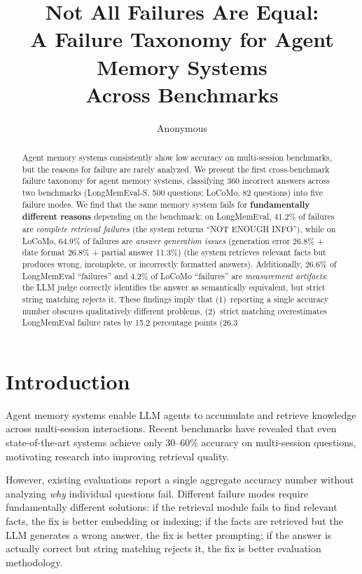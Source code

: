 ﻿\documentclass{article}
\title{Not All Failures Are Equal:\\ A Failure Taxonomy for Agent Memory Systems\\ Across Benchmarks}
\author{Anonymous}
\date{}
\begin{document}
\maketitle

\begin{abstract}
Agent memory systems consistently show low accuracy on multi-session benchmarks, but the reasons for failure are rarely analyzed. We present the first cross-benchmark failure taxonomy for agent memory systems, classifying 360 incorrect answers across two benchmarks (LongMemEval-S, 500 questions; LoCoMo, 82 questions) into five failure modes. We find that the same memory system fails for \textbf{fundamentally different reasons} depending on the benchmark: on LongMemEval, 41.2\% of failures are \emph{complete retrieval failures} (the system returns ``NOT ENOUGH INFO''), while on LoCoMo, 64.9\% of failures are \emph{answer generation issues} (generation error 26.8\% + date format 26.8\% + partial answer 11.3\%) (the system retrieves relevant facts but produces wrong, incomplete, or incorrectly formatted answers). Additionally, 26.6\% of LongMemEval ``failures'' and 4.2\% of LoCoMo ``failures'' are \emph{measurement artifacts}: the LLM judge correctly identifies the answer as semantically equivalent, but strict string matching rejects it. These findings imply that (1)~reporting a single accuracy number obscures qualitatively different problems, (2)~strict matching overestimates LongMemEval failure rates by 15.2 percentage points (26.3%
\end{abstract}

\section{Introduction}

Agent memory systems enable LLM agents to accumulate and retrieve knowledge across multi-session interactions. Recent benchmarks have revealed that even state-of-the-art systems achieve only 30--60\% accuracy on multi-session questions, motivating research into improving retrieval quality.

However, existing evaluations report a single aggregate accuracy number without analyzing \emph{why} individual questions fail. Different failure modes require fundamentally different solutions: if the retrieval module fails to find relevant facts, the fix is better embedding or indexing; if the facts are retrieved but the LLM generates a wrong answer, the fix is better prompting; if the answer is actually correct but string matching rejects it, the fix is better evaluation methodology.
\end{document}

